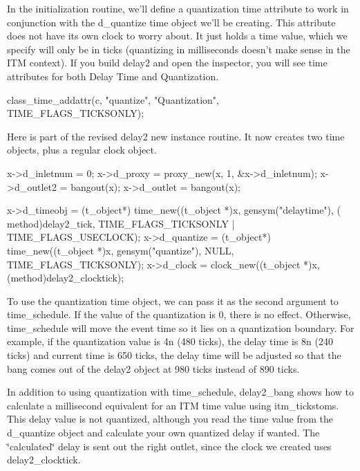 In the initialization routine, we'll define a quantization time attribute to work in conjunction with the d\_\-quantize time object we'll be creating. This attribute does not have its own clock to worry about. It just holds a time value, which we specify will only be in ticks (quantizing in milliseconds doesn't make sense in the ITM context). If you build delay2 and open the inspector, you will see time attributes for both Delay Time and Quantization. 
\begin{DoxyCode}
    class_time_addattr(c, "quantize", "Quantization", TIME_FLAGS_TICKSONLY);
\end{DoxyCode}


Here is part of the revised delay2 new instance routine. It now creates two time objects, plus a regular clock object.


\begin{DoxyCode}
    x->d_inletnum = 0;
    x->d_proxy = proxy_new(x, 1, &x->d_inletnum);
    x->d_outlet2 = bangout(x);
    x->d_outlet = bangout(x);

    x->d_timeobj = (t_object*) time_new((t_object *)x, gensym("delaytime"), (
      method)delay2_tick, TIME_FLAGS_TICKSONLY | TIME_FLAGS_USECLOCK);
    x->d_quantize = (t_object*) time_new((t_object *)x, gensym("quantize"), NULL,
       TIME_FLAGS_TICKSONLY);
    x->d_clock = clock_new((t_object *)x, (method)delay2_clocktick);
\end{DoxyCode}


To use the quantization time object, we can pass it as the second argument to time\_\-schedule. If the value of the quantization is 0, there is no effect. Otherwise, time\_\-schedule will move the event time so it lies on a quantization boundary. For example, if the quantization value is 4n (480 ticks), the delay time is 8n (240 ticks) and current time is 650 ticks, the delay time will be adjusted so that the bang comes out of the delay2 object at 980 ticks instead of 890 ticks.

In addition to using quantization with time\_\-schedule, delay2\_\-bang shows how to calculate a millisecond equivalent for an ITM time value using itm\_\-tickstoms. This delay value is not quantized, although you read the time value from the d\_\-quantize object and calculate your own quantized delay if wanted. The \char`\"{}calculated\char`\"{} delay is sent out the right outlet, since the clock we created uses delay2\_\-clocktick.


